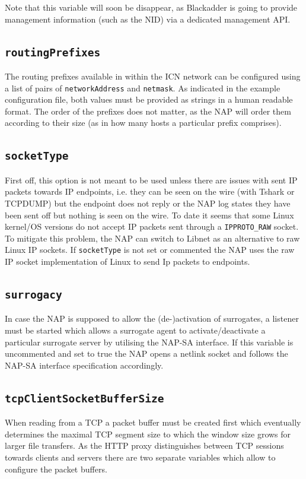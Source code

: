 \documentclass[a4paper,11pt,titlepage]{report}
\begin{document}
Note that this variable will soon be disappear, as Blackadder is going to provide management information (such as the \ac{NID}) via a dedicated management API.

\subsection{\texttt{routingPrefixes}}\label{sec:Introduction_Var_RoutingPrefixes}
The routing prefixes available in within the \ac{ICN} network can be configured using a list of pairs of \texttt{networkAddress} and \texttt{netmask}. As indicated in the example configuration file, both values must be provided as strings in a human readable format. The order of the prefixes does not matter, as the \ac{NAP} will order them according to their size (as in how many hosts a particular prefix comprises).

\subsection{\texttt{socketType}}\label{sec:Introduction_Var_SocketType}
First off, this option is not meant to be used unless there are issues with sent IP packets towards IP endpoints, i.e. they can be seen on the wire (with Tshark or TCPDUMP) but the endpoint does not reply or the NAP log states they have been sent off but nothing is seen on the wire. To date it seems that some Linux kernel/OS versions do not accept IP packets sent through a \texttt{IPPROTO\_RAW} socket. To mitigate this problem, the NAP can switch to Libnet \cite{Libnet} as an alternative to raw Linux IP sockets. If \texttt{socketType} is not set or commented the NAP uses the raw IP socket implementation of Linux to send Ip packets to endpoints.

\subsection{\texttt{surrogacy}}\label{sec:Introduction_Var_Surrogacy}
In case the NAP is supposed to allow the (de-)activation of surrogates, a listener must be started which allows a surrogate agent to activate/deactivate a particular surrogate server by utilising the NAP-SA interface.  If this variable is uncommented and set to true the NAP opens a netlink socket and follows the NAP-SA interface specification accordingly. 

\subsection{\texttt{tcpClientSocketBufferSize}}\label{sec:Introduction_Var_tcpClientSocketBufferSize}
When reading from a TCP a packet buffer must be created first which eventually determines the maximal TCP segment size to which the window size grows for larger file transfers. As the HTTP proxy distinguishes between TCP sessions towards clients and servers there are two separate variables which allow to configure the packet buffers.
\end{document}
